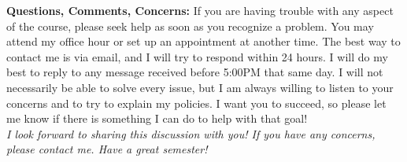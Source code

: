 \documentclass[12pt]{article}
\begin{document}
\noindent \textbf{Questions, Comments, Concerns:} If you are having trouble with any aspect of the course, please seek help as soon as you recognize a problem. You may attend my office hour or set up an appointment at another time. The best way to contact me is via email, and I will try to respond within 24 hours. I will do my best to reply to any message received before 5:00PM that same day. I will not necessarily be able to solve every issue, but I am always willing to listen to your concerns and to try to explain my policies. I want you to succeed, so please let me know if there is something I can do to help with that goal! \\


\emph{I look forward to sharing this discussion with you! If you have any concerns, please contact me.  Have a great semester!}
\end{document}
